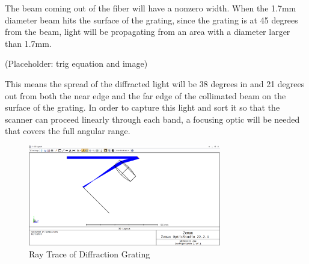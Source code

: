 The beam coming out of the fiber will have a nonzero width. When the 1.7mm diameter beam hits the surface of the grating, since the grating is at 45 degrees from the beam, light will be propagating from an area with a diameter larger than 1.7mm.

(Placeholder: trig equation and image)

This means the spread of the diffracted light will be 38 degrees in and 21 degrees out from both the near edge and the far edge of the collimated beam on the surface of the grating. In order to capture this light and sort it so that the scanner can proceed linearly through each band, a focusing optic will be needed that covers the full angular range.

\begin{figure}[H]
    \caption{Ray Trace of Diffraction Grating}
    \centering
    \includegraphics[width=0.75\textwidth]{images/Zemax Ray Trace.png}
\end{figure}

